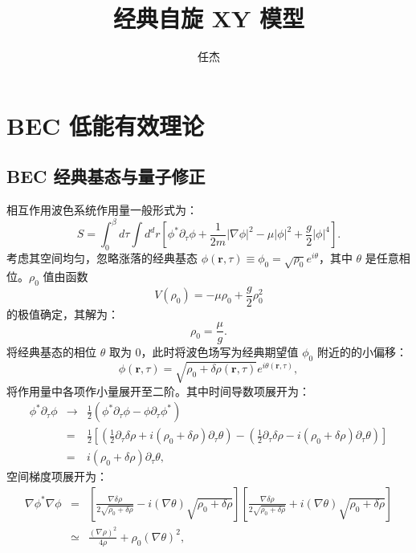 \documentclass[10pt,UTF8]{ctexart}
\begin{document}
\title{经典自旋 XY 模型}
\author{任杰}
\date{}

\maketitle


\section*{BEC 低能有效理论}
\subsection*{BEC 经典基态与量子修正}
\noindent
相互作用波色系统作用量一般形式为：
\begin{equation}
	S = \int_0^\beta d\tau \int d^d r \left[
		\phi^* \partial_\tau \phi + \frac{1}{2m}|\nabla \phi|^2 - \mu |\phi|^2 + \frac{g}{2} |\phi|^4 
	\right].
\end{equation}
考虑其空间均匀，忽略涨落的经典基态 $\phi(\bm r, \tau) \equiv \phi_0 = \sqrt{\rho_0}e^{i\theta}$，其中 $\theta$ 是任意相位。$\rho_0$ 值由函数
\begin{equation}
	V(\rho_0) = -\mu \rho_0 + \frac{g}{2} \rho_0^2
\end{equation}
的极值确定，其解为：
\begin{equation}
	\rho_0 = \frac{\mu}{g}.
\end{equation}
将经典基态的相位 $\theta$ 取为 0，此时将波色场写为经典期望值 $\phi_0$ 附近的的小偏移：
\begin{equation}
	\phi(\bm r, \tau) = \sqrt{\rho_0 + \delta \rho(\bm r, \tau)} e^{i\theta(\bm r,\tau)},
\end{equation}
将作用量中各项作小量展开至二阶。其中时间导数项展开为：
\begin{eqnarray}
	\phi^*\partial_\tau \phi &\rightarrow & \frac{1}{2}(\phi^*\partial_\tau \phi - \phi \partial_\tau \phi^*) \nonumber \\
	&=& \frac{1}{2}\left[
		\left(\frac{1}{2} \partial_\tau \delta\rho + i(\rho_0+\delta\rho)\partial_\tau\theta \right) -
		\left(\frac{1}{2} \partial_\tau \delta\rho - i(\rho_0+\delta\rho)\partial_\tau\theta \right)
		\right] \nonumber \\
	&=& i(\rho_0+\delta\rho)\partial_\tau\theta,
\end{eqnarray}
空间梯度项展开为：
\begin{eqnarray}
	\nabla\phi^* \nabla \phi 
	&=& \left[\frac{\nabla \delta\rho}{2\sqrt{\rho_0+\delta\rho}}-i(\nabla \theta)\sqrt{\rho_0+\delta\rho}\right]
		\left[\frac{\nabla \delta\rho}{2\sqrt{\rho_0+\delta\rho}}+i(\nabla \theta)\sqrt{\rho_0+\delta\rho}\right] \nonumber \\
	&\simeq & \frac{(\nabla \rho)^2}{4\rho} + \rho_0(\nabla \theta)^2,
\end{eqnarray}
\end{document}
